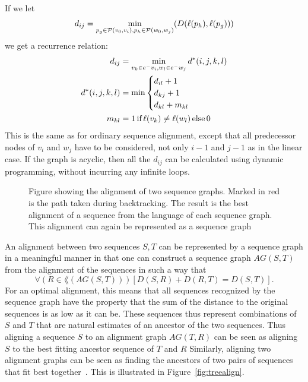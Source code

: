 If we let 
\[
  d_{ij} = \min_{p_g \in \paths(v_0, v_i), p_h \in \paths(w_0, w_j)}(D(\slabel(p_h), \slabel(p_g)))
\]  we get a recurrence relation:
\begin{align*}
  d_{ij} &= \min_{v_k \in \preds{v_i}, w_l \in \preds{w_j}} d^*(i, j, k, l)\\
  d^*(i, j, k, l) &= \min \begin{cases}
    d_{il} + 1\\
    d_{kj} + 1\\
    d_{kl} + m_{kl}\\
    \end{cases}    
    \\
    m_{kl} &= 1\, \text{if}\, \slabel(v_k) \neq \slabel(w_l)\, \text{else}\, 0\\
\end{align*}
This is the same as for ordinary sequence alignment, except that all predecessor nodes of $v_i$ and $w_j$ have to be considered, not only $i-1$ and $j-1$ as in the linear case.
If the graph is acyclic, then all the $d_{ij}$ can be calculated using dynamic programming, without incurring any infinite loops.
\begin{figure}
  \begin{tikzpicture}
    
  \end{tikzpicture}
  \caption{
    Figure showing the alignment of two sequence graphs.
    Marked in red is the path taken during backtracking.
    The result is the best alignment of a sequence from the language of each sequence graph.
    This alignment can again be represented as a sequence graph}
    \label{fig:seqgrapha}
\end{figure}

An alignment between two sequences $S, T$ can be represented by a sequence graph in a meaningful manner in that one can construct a sequence graph $AG(S, T)$ from the alignment of the sequences in such a way that 
\[
\forall (R \in \lang(AG(S, T)))\left[D(S, R)+D(R, T) =  D(S, T)\right].
\]
For an optimal alignment, this means that all sequences recognized by the sequence graph have the property that the sum of the distance to the original sequences is as low as it can be.
These sequences thus represent combinations of $S$ and $T$ that are natural estimates of an ancestor of the two sequences.
Thus aligning a sequence $S$ to an alignment graph $AG(T, R)$  can be seen as aligning $S$ to the best fitting ancestor sequence of $T$ and $R$
Similarly, aligning two alignment graphs can be seen as finding the ancestors of two pairs of sequences that fit best together~\cite{treealign, poa2}.
This is illustrated in Figure~\ref{fig:treealign}.

